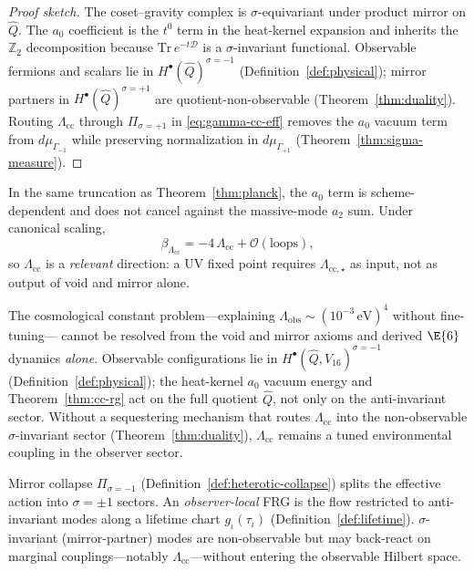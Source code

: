 \begin{proof}[Proof sketch]
The coset--gravity complex is $\sigma$-equivariant under product mirror on
$\hat Q$. The $a_0$ coefficient is the $t^0$ term in the heat-kernel
expansion and inherits the $\mathbb{Z}_2$ decomposition because
$\mathrm{Tr}\,e^{-t\mathcal{D}}$ is a $\sigma$-invariant functional.
Observable fermions and scalars lie in $H^\bullet(\hat Q)^{\sigma=-1}$
(Definition~\ref{def:physical}); mirror partners in
$H^\bullet(\hat Q)^{\sigma=+1}$ are quotient-non-observable
(Theorem~\ref{thm:duality}). Routing $\Lambda_{\mathrm{cc}}$ through
$\Pi_{\sigma=+1}$ in \eqref{eq:gamma-cc-eff} removes the $a_0$ vacuum term
from $d\mu_{\Gamma_{-1}}$ while preserving normalization in
$d\mu_{\Gamma_{+1}}$ (Theorem~\ref{thm:sigma-measure}).
\end{proof}

\begin{theorem}\label{thm:cc-rg}
In the same truncation as Theorem~\ref{thm:planck}, the $a_0$ term is
scheme-dependent and does not cancel against the massive-mode $a_2$ sum. Under
canonical scaling,
\begin{equation}\label{eq:beta-Lambda}
  \beta_{\Lambda_{\mathrm{cc}}}
  =-4\,\Lambda_{\mathrm{cc}}+\mathcal{O}(\text{loops}),
\end{equation}
so $\Lambda_{\mathrm{cc}}$ is a \emph{relevant} direction: a UV fixed point
requires $\Lambda_{\mathrm{cc},\star}$ as input, not as output of void and
mirror alone.
\end{theorem}

\begin{proposition}
\label{prop:cc-nogo}
The cosmological constant problem---explaining
$\Lambda_{\mathrm{obs}}\sim(10^{-3}\,\mathrm{eV})^4$ without fine-tuning---
cannot be resolved from the void and mirror axioms and derived $\E{6}$
dynamics \emph{alone}. Observable configurations lie in
$H^\bullet(\hat Q,V_{16})^{\sigma=-1}$ (Definition~\ref{def:physical}); the
heat-kernel $a_0$ vacuum energy and Theorem~\ref{thm:cc-rg} act on the full
quotient $\hat Q$, not only on the anti-invariant sector. Without a
sequestering mechanism that routes $\Lambda_{\mathrm{cc}}$ into the
non-observable $\sigma$-invariant sector (Theorem~\ref{thm:duality}),
$\Lambda_{\mathrm{cc}}$ remains a tuned environmental coupling in the
observer sector.
\end{proposition}

\begin{remark}\label{rmk:observer-frg}
Mirror collapse $\Pi_{\sigma=-1}$ (Definition~\ref{def:heterotic-collapse})
splits the effective action into $\sigma=\pm1$ sectors. An \emph{observer-local}
FRG is the flow restricted to anti-invariant modes along a lifetime chart
$g_\iota(\tau_\iota)$ (Definition~\ref{def:lifetime}). $\sigma$-invariant
(mirror-partner) modes are non-observable but may back-react on marginal
couplings---notably $\Lambda_{\mathrm{cc}}$---without entering the observable
Hilbert space.
\end{remark}

